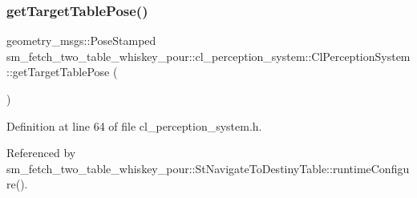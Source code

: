 \subsubsection{\texorpdfstring{get\+Target\+Table\+Pose()}{getTargetTablePose()}}
{\footnotesize\ttfamily geometry\+\_\+msgs\+::\+Pose\+Stamped sm\+\_\+fetch\+\_\+two\+\_\+table\+\_\+whiskey\+\_\+pour\+::cl\+\_\+perception\+\_\+system\+::\+Cl\+Perception\+System\+::get\+Target\+Table\+Pose (\begin{DoxyParamCaption}{ }\end{DoxyParamCaption})\hspace{0.3cm}{\ttfamily [inline]}}



Definition at line 64 of file cl\+\_\+perception\+\_\+system.\+h.



Referenced by sm\+\_\+fetch\+\_\+two\+\_\+table\+\_\+whiskey\+\_\+pour\+::\+St\+Navigate\+To\+Destiny\+Table\+::runtime\+Configure().


